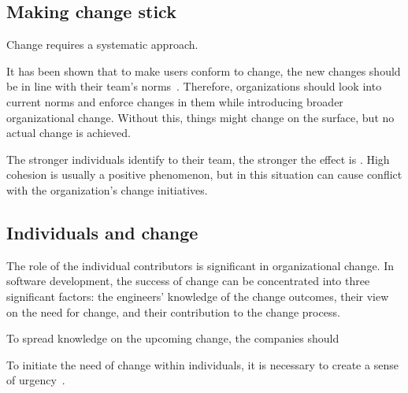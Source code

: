 \subsection{Making change stick}

Change requires a systematic approach. 

It has been shown that to make users conform to change, the new changes should be in line with their team's norms~\cite{terry_attitude-behaviour_2000}. Therefore, organizations should look into current norms and enforce changes in them while introducing broader organizational change. Without this, things might change on the surface, but no actual change is achieved.

The stronger individuals identify to their team, the stronger the effect is \cite{terry_attitude-behaviour_2000}. High cohesion is usually a positive phenomenon, but in this situation can cause conflict with the organization's change initiatives. 

\subsection{Individuals and change}

The role of the individual contributors is significant in organizational change. In software development, the success of change can be concentrated into three significant factors: the engineers' knowledge of the change outcomes, their view on the need for change, and their contribution to the change process. \cite{lenberg_initial_2017}

To spread knowledge on the upcoming change, the companies should 

To initiate the need of change within individuals, it is necessary to create a sense of urgency~\cite{lenberg_initial_2017}. 













